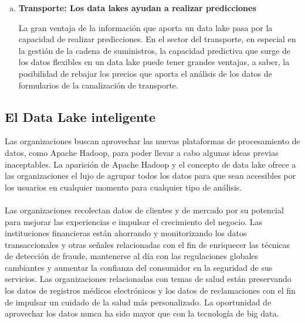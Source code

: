 \documentclass[11pt,a4paper]{article}
\begin{document}
\begin{enumerate}[a.]
			\item \textbf{Transporte: Los data lakes ayudan a realizar predicciones}
			
			La gran ventaja de la información que aporta un data lake pasa por la capacidad de realizar predicciones.
			En el sector del transporte, en especial en la gestión de la cadena de suministros, la capacidad predictiva que surge de los datos flexibles en un data lake puede tener grandes ventajas, a saber, la posibilidad de rebajar los precios que aporta el análisis de los datos de formularios de la canalización de transporte.\cite{DWarehouseVsDLake01:Online}
			
			
		\end{enumerate}
		
		\subsection{El Data Lake inteligente}
		Las organizaciones buscan aprovechar las nuevas plataformas de procesamiento de datos, como Apache Hadoop, para poder llevar a cabo algunas ideas previas inaceptables. La aparición de Apache Hadoop y el concepto de data lake ofrece a las organizaciones el lujo de agrupar todos los datos para que sean accesibles por los usuarios en cualquier momento para cualquier tipo de análisis.\\
		\\
		Las organizaciones recolectan datos de clientes y de mercado por su potencial para mejorar las experiencias e impulsar el crecimiento del negocio. Las instituciones financieras están ahorrando y monitorizando los datos transaccionales y otras señales relacionadas con el fin de enriquecer las técnicas de detección de fraude, mantenerse al día con las regulaciones globales cambiantes y aumentar la confianza del consumidor en la seguridad de sus servicios. Las organizaciones relacionadas con temas de salud están preservando los datos de registros médicos electrónicos y los datos de reclamaciones con el fin de impulsar un cuidado de la salud más personalizado. La oportunidad de aprovechar los datos nunca ha sido mayor que con la tecnología de big data.	
		
		\newpage

		
		
		
	
\end{document}
